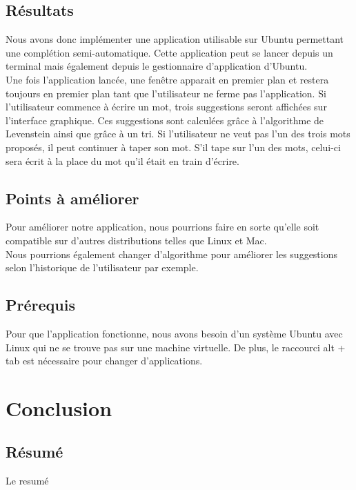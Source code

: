 \documentclass[a4paper, 11pt]{report}
\begin{document}
\section{Résultats}
Nous avons donc implémenter une application utilisable sur Ubuntu permettant une complétion semi-automatique. Cette application peut se lancer depuis un terminal mais également depuis le gestionnaire d'application d'Ubuntu. \\
Une fois l'application lancée, une fenêtre apparait en premier plan et restera toujours en premier plan tant que l'utilisateur ne ferme pas l'application. Si l'utilisateur commence à écrire un mot, trois suggestions seront affichées sur l'interface graphique. Ces suggestions sont calculées grâce à l'algorithme de Levenstein ainsi que grâce à un tri. Si l'utilisateur ne veut pas l'un des trois mots proposés, il peut continuer à taper son mot. S'il tape sur l'un des mots, celui-ci sera écrit à la place du mot qu'il était en train d'écrire.  

\section{Points à améliorer}

Pour améliorer notre application, nous pourrions faire en sorte qu'elle soit compatible sur d'autres distributions telles que Linux et Mac. \\
Nous pourrions également changer d'algorithme pour améliorer les suggestions selon l'historique de l'utilisateur par exemple.

\section{Prérequis}

Pour que l'application fonctionne, nous avons besoin d'un système Ubuntu avec Linux qui ne se trouve pas sur une machine virtuelle. De plus, le raccourci alt + tab est nécessaire pour changer d'applications. 

\chapter*{Conclusion}
\newpage
\begin{center}
    \vspace*{\fill} %
    \section*{Résumé}
    \begin{justify}
Le resumé


    \end{justify}
\end{center}
\end{document}
